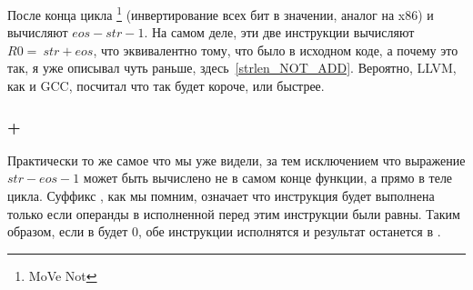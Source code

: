 После конца цикла \footnote{MoVe Not} (инвертирование всех бит в значении, аналог \NOT на x86) 
и \ADD вычисляют $eos - str - 1$. 
На самом деле, эти две инструкции вычисляют $R0 = ~str + eos$, что эквивалентно тому, что было в исходном коде, 
а почему это так, я уже описывал чуть раньше, здесь~\ref{strlen_NOT_ADD}. 
Вероятно, LLVM, как и GCC, посчитал что так будет короче, или быстрее.


\subsubsection{\OptimizingKeil{} + \ARMMode}



Практически то же самое что мы уже видели, за тем исключением что выражение $str - eos - 1$ может быть вычислено
не в самом конце функции, а прямо в теле цикла. 
Суффикс , как мы помним, означает что инструкция будет выполнена только
если операнды в исполненной перед этим инструкции \CMP были равны. 
Таким образом, если в \Rzero будет $0$, обе инструкции  исполнятся и результат останется в \Rzero.

